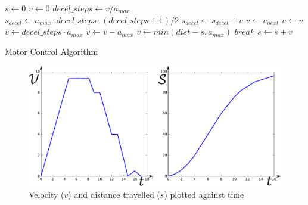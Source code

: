 \begin{algorithm}[h]
  \begin{algorithmic}[1]
\State $s \gets 0$
\State $v \gets 0$
  \State $decel\_steps\gets v / a_{max}$
  \State $s_{decel} \gets a_{max} \cdot decel\_steps \cdot (decel\_steps + 1) / 2$
    \State $s_{decel} \gets s_{decel} + v$
  \EndIf
    \State $v \gets v_{next}$ 
    \State $ v \gets v $     
  \Else
      \State $v \gets decel\_steps \cdot a_{max}$
    \Else
      \State $v \gets v - a_{max}$
      \EndIf
  \EndIf
      
      \State $v \gets min(dist - s, a_{max})$
    \Else
      \State $break$  
      \EndIf
      \EndIf
  \State $s \gets s + v$
\EndWhile
\end{algorithmic}
\caption{Motor Control Algorithm\label{alg-motor}}
\end{algorithm}
\begin{figure}[h]
  \centerline{\includegraphics[scale=0.65]{fig/motor_control_graph.pdf}}
\caption{Velocity ($v$) and distance travelled ($s$) plotted against time\label{fig-motor}}
\end{figure}

